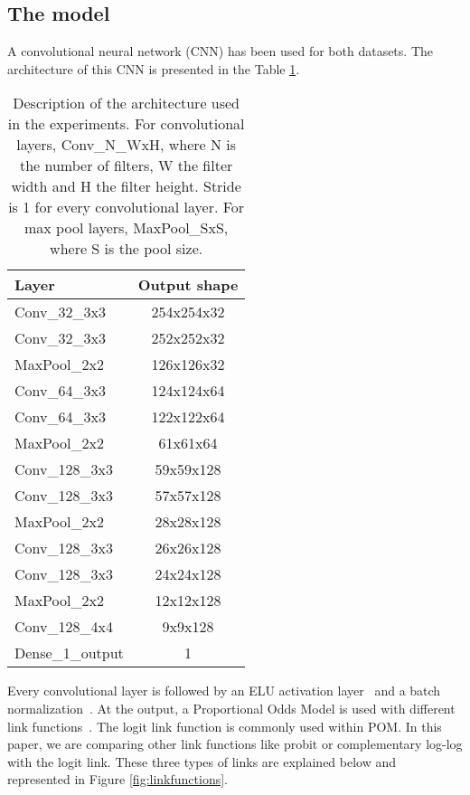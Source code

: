 \documentclass[journal]{IEEEtran}
\begin{document}
	\subsection{The model}
	\label{sect:model}
	A convolutional neural network (CNN) has been used for both datasets. The architecture of this CNN is presented in the Table \ref{table:CNNArchitecture}.
	
	\begin{table}[!t]
		\caption{Description of the architecture used in the experiments. For convolutional layers, Conv\_N\_WxH, where N is the number of filters, W the filter width and H the filter height. Stride is 1 for every convolutional layer. For max pool layers, MaxPool\_SxS, where S is the pool size.}
		\label{table:CNNArchitecture}
		\centering
		\begin{tabular}{|l|c|}
			\hline
			\textbf{Layer} & \textbf{Output shape}\\
			\hline
			Conv\_32\_3x3 & 254x254x32\\\hline
			Conv\_32\_3x3 & 252x252x32\\\hline
			MaxPool\_2x2 & 126x126x32\\\hline
			
			Conv\_64\_3x3 & 124x124x64\\\hline
			Conv\_64\_3x3 & 122x122x64\\\hline
			MaxPool\_2x2 & 61x61x64\\\hline
			
			Conv\_128\_3x3 & 59x59x128\\\hline
			Conv\_128\_3x3 & 57x57x128\\\hline
			MaxPool\_2x2 & 28x28x128\\\hline
			
			Conv\_128\_3x3 & 26x26x128\\\hline
			Conv\_128\_3x3 & 24x24x128\\\hline
			MaxPool\_2x2 & 12x12x128\\\hline
			
			Conv\_128\_4x4 & 9x9x128\\\hline
			Dense\_1\_output & 1\\
			\hline
		\end{tabular}	
	\end{table}
	
	Every convolutional layer is followed by an ELU activation layer~\cite{clevert2015fast} and a batch normalization~\cite{ioffe2015batch}. At the output, a Proportional Odds Model is used with different link functions~\cite{agresti2010analysis}. The logit link function is commonly used within POM. In this paper, we are comparing other link functions like probit or complementary log-log with the logit link. These three types of links are explained below and represented in Figure \ref{fig:linkfunctions}.
	
\end{document}
